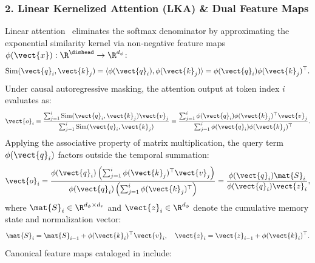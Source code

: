 \subsubsection{2. Linear Kernelized Attention (LKA) \& Dual Feature Maps}
\label{subsubsec:lka_contract}
Linear attention~\cite{katharopoulos2020transformers} eliminates the softmax denominator by approximating the exponential similarity kernel via non-negative feature maps $\phi(\vect{x}): \R^{\dimhead} \to \R^{d_\phi}$:
\begin{equation}
\operatorname{Sim}(\vect{q}_i, \vect{k}_j) = \langle \phi(\vect{q}_i), \phi(\vect{k}_j) \rangle = \phi(\vect{q}_i) \phi(\vect{k}_j)^\top.
\label{eq:kernel_inner_product}
\end{equation}
Under causal autoregressive masking, the attention output at token index $i$ evaluates as:
\begin{equation}
\vect{o}_i = \frac{\sum_{j=1}^i \operatorname{Sim}(\vect{q}_i, \vect{k}_j) \vect{v}_j}{\sum_{j=1}^i \operatorname{Sim}(\vect{q}_i, \vect{k}_j)} = \frac{\sum_{j=1}^i \phi(\vect{q}_i) \phi(\vect{k}_j)^\top \vect{v}_j}{\sum_{j=1}^i \phi(\vect{q}_i) \phi(\vect{k}_j)^\top}.
\end{equation}
Applying the associative property of matrix multiplication, the query term $\phi(\vect{q}_i)$ factors outside the temporal summation:
\begin{equation}
\vect{o}_i = \frac{\phi(\vect{q}_i) \left( \sum_{j=1}^i \phi(\vect{k}_j)^\top \vect{v}_j \right)}{\phi(\vect{q}_i) \left( \sum_{j=1}^i \phi(\vect{k}_j)^\top \right)} = \frac{\phi(\vect{q}_i) \mat{S}_i}{\phi(\vect{q}_i) \vect{z}_i},
\label{eq:linear_attention_factorization_exact}
\end{equation}
where $\mat{S}_i \in \R^{d_\phi \times d_v}$ and $\vect{z}_i \in \R^{d_\phi}$ denote the cumulative memory state and normalization vector:
\begin{equation}
\mat{S}_i = \mat{S}_{i-1} + \phi(\vect{k}_i)^\top \vect{v}_i, \quad \vect{z}_i = \vect{z}_{i-1} + \phi(\vect{k}_i)^\top.
\label{eq:linear_state_recurrence}
\end{equation}
Canonical feature maps cataloged in \neuralops{} include:
